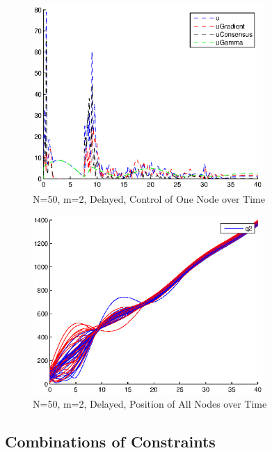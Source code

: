 \documentclass[10pt, conference]{IEEEtran}
\begin{document}
\begin{figure}[!h]
  \begin{center}
    \includegraphics[width=3.45in]{n50m2vmax100amax1000delayControl}
  \end{center}

  \caption{\small N=50, m=2, Delayed, Control of One Node over Time}
  \label{fig:n50m2vmax100amax1000delayControl}
\end{figure}

\begin{figure}[!h]
  \begin{center}
    \includegraphics[width=3.45in]{n50m2vmax100amax1000delayPosition}
  \end{center}

  \caption{\small N=50, m=2, Delayed, Position of All Nodes over Time}
  \label{fig:n50m2vmax100amax1000delayPosition}
\end{figure}

\clearpage

\subsection{Combinations of Constraints}
\end{document}
